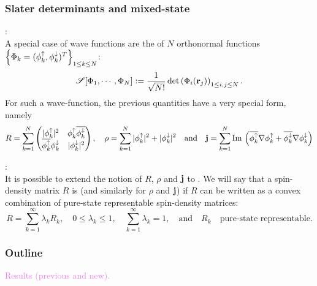 \documentclass[9pt,xcolor=dvipsnames]{beamer}
\begin{document}
\begin{frame}

\frametitle{Slater determinants and mixed-state}

:\\
A special case of wave functions are the  of $N$ orthonormal functions $\left\{ \Phi_k = (\phi_k^{\uparrow}, \phi_k^{\downarrow})^T \right\}_{1 \le k \le N}$:
\[
	\mathscr{S}[\Phi_1, \cdots, \Phi_N] := \dfrac{1}{\sqrt{N!}} \det \left( \Phi_i ({\bold r}_j) \right)_{1 \le i,j \le N}.
\]
For such a wave-function, the previous quantities have a very special form, namely
\[
	R = \sum_{k=1}^N \begin{pmatrix} | \phi^{\uparrow}_k |^2 & \phi^{\uparrow}_k \overline{\phi^{\downarrow}_k} \\ \overline{\phi^{\uparrow}_k} \phi^{\downarrow}_k & | \phi^{\downarrow}_k |^2 \end{pmatrix}, 
	\quad
	\rho = \sum_{k=1}^N  | \phi^{\uparrow}_k |^2 +  | \phi^{\downarrow}_k |^2
	\quad \text{and} \quad
	{\bold j} = \sum_{k=1}^N {\mathrm{Im }\, } \left( \overline{\phi_k^{\uparrow}} \nabla \phi_k^{\uparrow} + \overline{\phi_k^{\downarrow}} \nabla \phi_k^{\downarrow} \right)
\]

:\\
It is possible to extend the notion of $R$, $\rho$ and ${\bold j}$ to . We will say that a spin-density matrix $R$ is  (and similarly for $\rho$ and ${\bold j}$) if $R$ can be written as a convex combination of pure-state representable spin-density matrices:
\[
	R = \sum_{k=1}^\infty \lambda_k R_k, \quad 0 \le \lambda_k \le 1, \quad \sum_{k=1}^\infty \lambda_k = 1, \quad \text{and} \quad R_k \quad \text{pure-state representable}.
\]



\end{frame}



\begin{frame}

\frametitle{Outline}


\begin{center}
\textcolor{violet}{
	\huge{Results (previous and new).}}
\end{center}

\end{frame}

\end{document}

